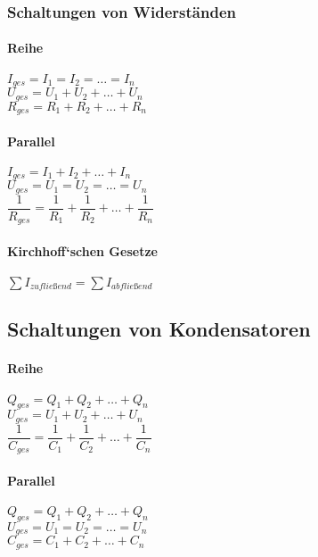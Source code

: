 \documentclass[a4paper]{article}
\begin{document}
\subsubsection{Schaltungen von Widerständen}

\paragraph{Reihe}

\begin{center}
	\Large
		$I_{ges} = I_1 = I_2 = … = I_n$\\[0,5cm]
		$U_{ges} = U_1 + U_2 + … + U_n$\\[0,5cm]
		$R_{ges} = R_1 + R_2 + … + R_n$\\[1cm]
	\normalsize
\end{center}


\paragraph{Parallel}

\begin{center}
	\Large
		$I_{ges} = I_1 + I_2 + … + I_n$\\[0,5cm]
		$U_{ges} = U_1 = U_2 = … = U_n$\\[0,5cm]
		$\dfrac{1}{R_{ges}} = \dfrac{1}{R_1} + \dfrac{1}{R_2} + … + \dfrac{1}{R_n}$\\[0,5cm]
	\normalsize
\end{center}


\paragraph{Kirchhoff‘schen Gesetze}

\begin{center}
    \Large 
        $\sum{I_{zufließend}} = \sum{I_{abfließend}}$
    \normalsize
\end{center}



\subsection{Schaltungen von Kondensatoren}

\paragraph{Reihe}

\begin{center}
	\Large
		$Q_{ges} = Q_1 + Q_2 + … + Q_n$\\[0,5cm]
		$U_{ges} = U_1 + U_2 + … + U_n$\\[0,5cm]
		$\dfrac{1}{C_{ges}} = \dfrac{1}{C_1} + \dfrac{1}{C_2} + … + \dfrac{1}{C_n}$\\[0,5cm]
	\normalsize
\end{center}


\paragraph{Parallel}

\begin{center}
	\Large
		$Q_{ges} = Q_1 + Q_2 + … + Q_n$\\[0,5cm]
		$U_{ges} = U_1 = U_2 = … = U_n$\\[0,5cm]
		$C_{ges} = C_1 + C_2 + … + C_n$\\[1cm]
	\normalsize
\end{center}
\end{document}

